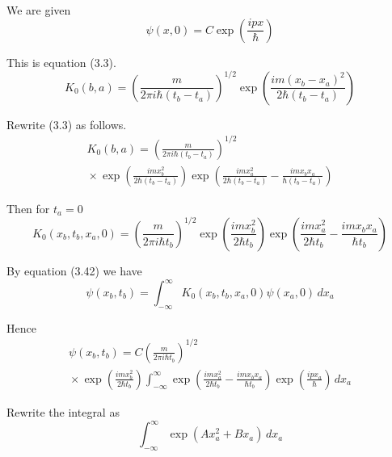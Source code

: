 


We are given
\begin{equation*}
\psi(x,0)=C\exp\left(\frac{ipx}{\hbar}\right)
\end{equation*}

\noindent
This is equation (3.3).
\begin{equation*}
K_0(b,a)=\left(\frac{m}{2\pi i\hbar(t_b-t_a)}\right)^{1/2}
\exp\left(\frac{im(x_b-x_a)^2}{2\hbar(t_b-t_a)}\right)
\tag{3.3}
\end{equation*}

Rewrite (3.3) as follows.
\begin{multline*}
K_0(b,a)=\left(\frac{m}{2\pi i\hbar(t_b-t_a)}\right)^{1/2}
\\
{}\times
\exp\left(\frac{imx_b^2}{2\hbar(t_b-t_a)}\right)
\exp\left(\frac{imx_a^2}{2\hbar(t_b-t_a)}-\frac{imx_bx_a}{\hbar(t_b-t_a)}\right)
\end{multline*}

Then for $t_a=0$
\begin{equation*}
K_0(x_b,t_b,x_a,0)=\left(\frac{m}{2\pi i\hbar t_b}\right)^{1/2}
\exp\left(\frac{imx_b^2}{2\hbar t_b}\right)
\exp\left(\frac{imx_a^2}{2\hbar t_b}-\frac{imx_bx_a}{\hbar t_b}\right)
\end{equation*}

By equation (3.42) we have
\begin{equation*}
\psi(x_b,t_b)=\int_{-\infty}^\infty K_0(x_b,t_b,x_a,0)\psi(x_a,0)\,dx_a
\end{equation*}

Hence
\begin{multline*}
\psi(x_b,t_b)=C\left(\frac{m}{2\pi i\hbar t_b}\right)^{1/2}
\\
{}\times
\exp\left(\frac{imx_b^2}{2\hbar t_b}\right)
\int_{-\infty}^\infty
\exp\left(\frac{imx_a^2}{2\hbar t_b}-\frac{imx_bx_a}{\hbar t_b}\right)
\exp\left(\frac{ipx_a}{\hbar}\right)\,dx_a
\tag{1}
\end{multline*}

Rewrite the integral as
\begin{equation*}
\int_{-\infty}^\infty\exp(Ax_a^2+Bx_a)\,dx_a
\end{equation*}

